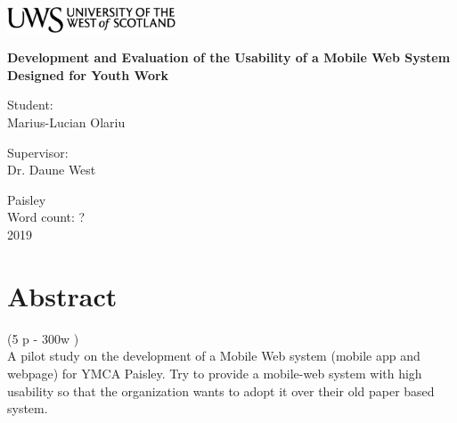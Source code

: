 \documentclass[version=last,fontsize=13pt]{scrartcl}
\begin{document}
\begin{titlepage}
	\begin{center}	
		\includegraphics[width = 5cm,height = 1.5cm]{./imgs/uws_logo.png}\\[5cm]

	{ \huge \bfseries %
		Development and Evaluation of the Usability of a Mobile Web System Designed for Youth Work\\ \Large}

	\vspace{2cm}
	
	\vspace{2cm}			
			

			
		\begin{flushright}
				\large Student:\\
				Marius-Lucian Olariu\\[1cm]
		\end{flushright}
		
	
		\begin{flushleft}
			 \large
				Supervisor: \\
				Dr. Daune West \\[1cm]
		\end{flushleft}
		
	\vspace{2cm}	
	
		
		\vfill

			{\large {Paisley \\ Word count: ? \\ 2019}}
		\end{center}
\end{titlepage}

\renewcommand{\labelenumi}{\roman{enumi}}

\newpage

\tableofcontents

\newpage

\listoffigures

\newpage


\section{Abstract}(5 p - 300w )\\
A pilot study on the development of a Mobile Web system (mobile app and webpage) for YMCA Paisley. Try to provide a mobile-web system with high usability so that the organization wants to adopt it over their old paper based system.\\
\end{document}

